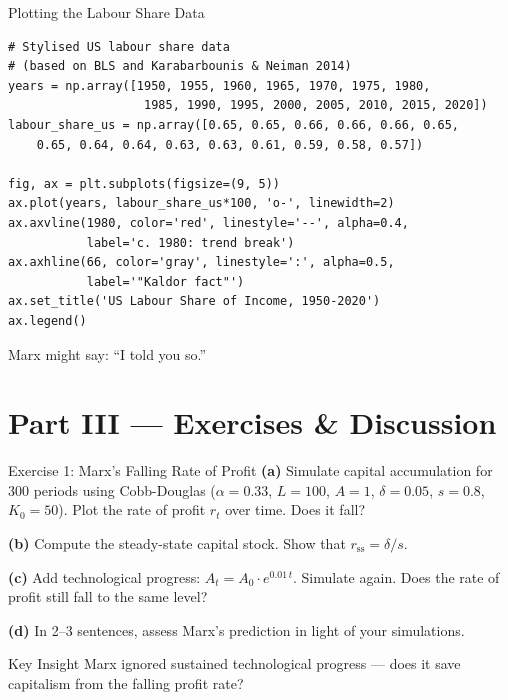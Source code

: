 \documentclass[aspectratio=169, 10pt]{beamer}
\begin{document}
\begin{frame}[fragile]{Plotting the Labour Share Data}
\begin{lstlisting}
# Stylised US labour share data
# (based on BLS and Karabarbounis & Neiman 2014)
years = np.array([1950, 1955, 1960, 1965, 1970, 1975, 1980,
                   1985, 1990, 1995, 2000, 2005, 2010, 2015, 2020])
labour_share_us = np.array([0.65, 0.65, 0.66, 0.66, 0.66, 0.65,
    0.65, 0.64, 0.64, 0.63, 0.63, 0.61, 0.59, 0.58, 0.57])

fig, ax = plt.subplots(figsize=(9, 5))
ax.plot(years, labour_share_us*100, 'o-', linewidth=2)
ax.axvline(1980, color='red', linestyle='--', alpha=0.4,
           label='c. 1980: trend break')
ax.axhline(66, color='gray', linestyle=':', alpha=0.5,
           label='"Kaldor fact"')
ax.set_title('US Labour Share of Income, 1950-2020')
ax.legend()
\end{lstlisting}
\vspace{0.3em}
Marx might say: ``I told you so.''
\end{frame}

\section{Part III --- Exercises \& Discussion}

\begin{frame}{Exercise 1: Marx's Falling Rate of Profit}
\textbf{(a)} Simulate capital accumulation for 300 periods using
Cobb-Douglas ($\alpha=0.33$, $L=100$, $A=1$, $\delta=0.05$,
$s=0.8$, $K_0=50$). Plot the rate of profit $r_t$ over time.
Does it fall?
\vspace{0.5em}

\textbf{(b)} Compute the steady-state capital stock. Show that
$r_{\text{ss}} = \delta / s$.
\vspace{0.5em}

\textbf{(c)} Add technological progress: $A_t = A_0 \cdot e^{0.01\,t}$.
Simulate again. Does the rate of profit still fall to the same level?
\vspace{0.5em}

\textbf{(d)} In 2--3 sentences, assess Marx's prediction in light of
your simulations.

\vspace{0.5em}
\begin{alertblock}{Key Insight}
Marx ignored sustained technological progress --- does it save
capitalism from the falling profit rate?
\end{alertblock}
\end{frame}
\end{document}
